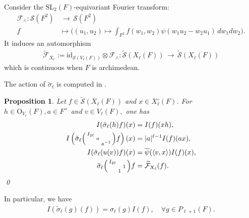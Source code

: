 \documentclass[11pt,a4paper,reqno]{amsart}
\newtheorem{prop}[thm]{Proposition}
\theoremstyle{remark}
\numberwithin{equation}{section}
\newcommand{\SL}{\mathrm{SL}}
\newcommand{\lto}{\,\longrightarrow\,}
\theoremstyle{definition}
\numberwithin{equation}{section}
\newenvironment{psmatrix}
  {\left(\begin{smallmatrix}}
  {\end{smallmatrix}\right)}
\begin{document}
Consider the $\SL_2(F)$-equivariant Fourier transform:
\begin{align*}
    \mathcal{F}_{\wedge}: \mathcal{S}(F^2)&\lto \mathcal{S}(F^2)\\
    f&\mapsto \bigg( (u_1,u_2)\mapsto \int_{F^2}f(w_1,w_2)\psi(w_1u_2-w_2u_1) \,dw_1dw_2\bigg).
\end{align*}
It induces an automorphism
\begin{align*}
    \widetilde{\mathcal{F}}_{X_\ell}:=\mathrm{id}_{\mathcal{S}(V_\ell(F))}\otimes \mathcal{F}_{\wedge}:\widetilde{\mathcal{S}}(X_{\ell}(F))\lto \widetilde{\mathcal{S}}(X_\ell(F))
\end{align*}
which is continuous when $F$ is archimedean. 


The action of $\tilde{\sigma}_\ell$ is computed in \cite[Proposition 3.3]{Getz:Quad}.

\begin{prop}\label{prop:action}
    Let $f\in \widetilde{\mathcal{S}}(X_\ell(F))$ and $x\in X_\ell^\circ(F)$. For $h\in \mathrm{O}_{V_\ell}(F),a\in F^\times$ and $v\in V_\ell(F),$ one has
    \begin{align*}
        I(\tilde{\sigma}_\ell(h)f)(x)&=I(f)(xh),\\
        I\left(\tilde{\sigma}_\ell\begin{psmatrix}
            I_{2\ell} & &\\
            & a &\\
            & & a^{-1}
        \end{psmatrix}f\right)(x)&=|a|^{\ell-1} I(f)(ax),\\
        I(\tilde{\sigma}_\ell(u(v))f)(x)&=\overline{\psi}(\langle v,x\rangle )I(f)(x),\\
        \tilde{\sigma}_\ell \begin{psmatrix}
            I_{2\ell} & &\\
             & & 1\\
             &1 &
        \end{psmatrix}f&=\widetilde{\mathcal{F}}_{X_\ell}(f).
    \end{align*}\qed
\end{prop}
\noindent In particular, we have 
\begin{align}\label{eq:Pequal}
    I(\tilde{\sigma}_\ell(g)(f))=\sigma_\ell(g)I(f),\quad \forall g\in P_{\ell+1}(F).
\end{align}
\end{document}
